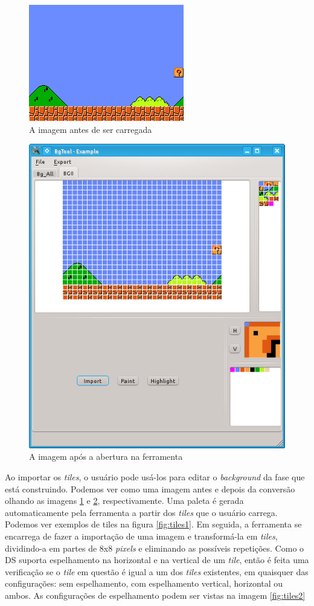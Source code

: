 \documentclass[brazil]{abnt}
\begin{document}
\begin{figure}[h!]
\centering
\includegraphics[scale=1]{imgs/exemplo.png}
\caption{A imagem antes de ser carregada}
\label{fig:exemplo}
\end{figure}

\begin{figure}[h!]
\centering
\includegraphics[scale=.5]{imgs/bgtool1.png}
\caption{A imagem após a abertura na ferramenta}
\label{fig:bgtool1}
\end{figure}

Ao importar os \textit{tiles}, o usuário pode usá-los para editar o \textit{background} da fase que está construindo. Podemos ver como uma imagem antes e depois da conversão olhando as imagens \ref{fig:exemplo} e \ref{fig:bgtool1}, respectivamente. Uma paleta é gerada automaticamente pela ferramenta a partir dos \textit{tiles} que o usuário carrega. Podemos ver exemplos de tiles na figura \ref{fig:tiles1}. Em seguida, a ferramenta se encarrega de fazer a importação de uma imagem e transformá-la em \textit{tiles}, dividindo-a em partes de 8x8 \textit{pixels} e eliminando as possíveis repetições. Como o DS suporta espelhamento na horizontal e na vertical de um \textit{tile}, então é feita uma verificação se o \textit{tile} em questão é igual a um dos \textit{tiles} existentes, em quaisquer das configurações: sem espelhamento, com espelhamento vertical, horizontal ou ambos. As configurações de espelhamento podem ser vistas na imagem \ref{fig:tiles2}
\end{document}
